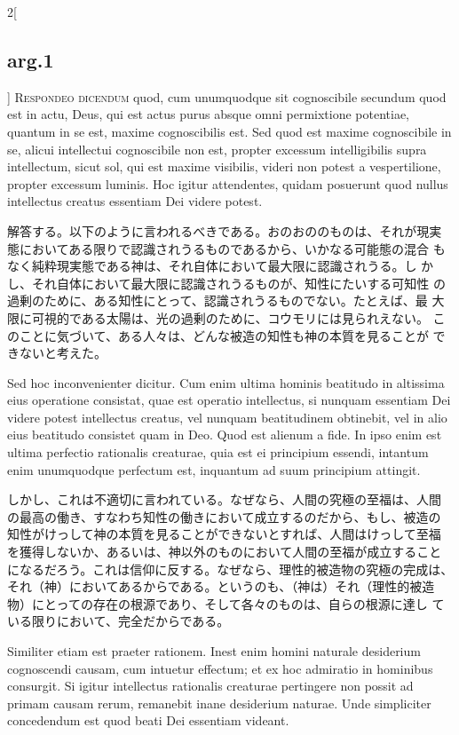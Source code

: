 \documentclass[paper=a4paper,fontsize=10pt,jafontsize=9pt,titlepage]{jlreq}
\begin{document}
\begin{paracol}{2}[\subsection{arg.1}]
{\scshape Respondeo dicendum} quod, cum unumquodque sit cognoscibile
secundum quod est in actu, Deus, qui est actus purus absque omni
permixtione potentiae, quantum in se est, maxime cognoscibilis
est. Sed quod est maxime cognoscibile in se, alicui intellectui
cognoscibile non est, propter excessum intelligibilis supra
intellectum, sicut sol, qui est maxime visibilis, videri non potest a
vespertilione, propter excessum luminis. Hoc igitur attendentes,
quidam posuerunt quod nullus intellectus creatus essentiam Dei videre
potest.

\switchcolumn

解答する。以下のように言われるべきである。おのおののものは、それが現実
態においてある限りで認識されうるものであるから、いかなる可能態の混合
もなく純粋現実態である神は、それ自体において最大限に認識されうる。し
かし、それ自体において最大限に認識されうるものが、知性にたいする可知性
の過剰のために、ある知性にとって、認識されうるものでない。たとえば、最
大限に可視的である太陽は、光の過剰のために、コウモリには見られえない。
このことに気づいて、ある人々は、どんな被造の知性も神の本質を見ることが
できないと考えた。

\switchcolumn*

Sed hoc inconvenienter dicitur. Cum enim ultima hominis beatitudo in
altissima eius operatione consistat, quae est operatio intellectus, si
nunquam essentiam Dei videre potest intellectus creatus, vel nunquam
beatitudinem obtinebit, vel in alio eius beatitudo consistet quam in
Deo. Quod est alienum a fide.  In ipso enim est ultima perfectio
rationalis creaturae, quia est ei principium essendi, intantum enim
unumquodque perfectum est, inquantum ad suum principium attingit.

\switchcolumn

しかし、これは不適切に言われている。なぜなら、人間の究極の至福は、人間
の最高の働き、すなわち知性の働きにおいて成立するのだから、もし、被造の
知性がけっして神の本質を見ることができないとすれば、人間はけっして至福
を獲得しないか、あるいは、神以外のものにおいて人間の至福が成立すること
になるだろう。これは信仰に反する。なぜなら、理性的被造物の究極の完成は、
それ（神）においてあるからである。というのも、（神は）それ（理性的被造
 物）にとっての存在の根源であり、そして各々のものは、自らの根源に達し
ている限りにおいて、完全だからである。

\switchcolumn*

Similiter etiam est praeter rationem. Inest enim homini
naturale desiderium cognoscendi causam, cum intuetur effectum; et ex
hoc admiratio in hominibus consurgit. Si igitur intellectus rationalis
creaturae pertingere non possit ad primam causam rerum, remanebit
inane desiderium naturae. Unde simpliciter concedendum est quod beati
Dei essentiam videant.


\end{paracol}
\end{document}
